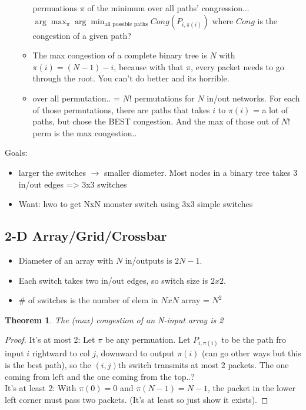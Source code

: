 \documentclass[10pt]{article}
\newcommand{\ra}{\rightarrow}
\newtheorem{theorem}{Theorem}[subsection]
\begin{document}
\begin{itemize}
\begin{itemize}
    permuations $\pi$ of the minimum over all paths' congression...
    $\arg\max_{\pi}\arg\min_{\text{all possible paths}}Cong(P_{i, \pi(i)})$ where $Cong$ is the congestion of a given path?
  \item The max congestion
    of a complete binary tree is $N$ with $\pi(i) = (N-1)-i$, because
    with that $\pi$, every packet needs to go through the root. You can't do better and its
    horrible.
  \item over all permutation.. = $N!$ permutations for $N$ in/out
    networks. For each of those permutations, there are paths that
    takes $i$ to $\pi(i)$ = a lot of paths, but chose the BEST
    congestion. And the max of those out of $N!$ perm is the max congestion..
  \end{itemize}


\end{itemize}

Goals:
\begin{itemize} 
\item larger the switches $\ra$ smaller diameter. Most nodes in a binary
  tree takes 3 in/out edges => 3x3 switches
\item Want: hwo to get NxN monster switch using 3x3 simple switches
\end{itemize}

\subsection{2-D Array/Grid/Crossbar}
\label{sec:2-d-array}
\begin{itemize}
\item Diameter of an array with $N$ in/outputs is $2N-1$.
\item Each switch takes two in/out edges, so switch size is $2x2$.
\item \# of switches is the number of elem in $NxN$ array = $N^2$
\end{itemize}


\begin{theorem}
The (max) congestion of an N-input array is 2
\end{theorem}
 \begin{proof} 
It's at most 2: Let $\pi$ be any permuation. Let $P_{i, \pi(i)}$ to be the path fro
input $i$ rightward to col $j$, downward to output $\pi(i)$ (can go
other ways but this is the best path), so the $(i, j)$th switch transmits at most 2 packets. The one coming from
left and the one coming from the top..?\\
It's at least 2: With $\pi(0) = 0$ and $\pi(N-1) = N-1$, the packet in the lower left
corner must pass two packets. (It's at least so just show it exists).
  \end{proof}
\end{document}
